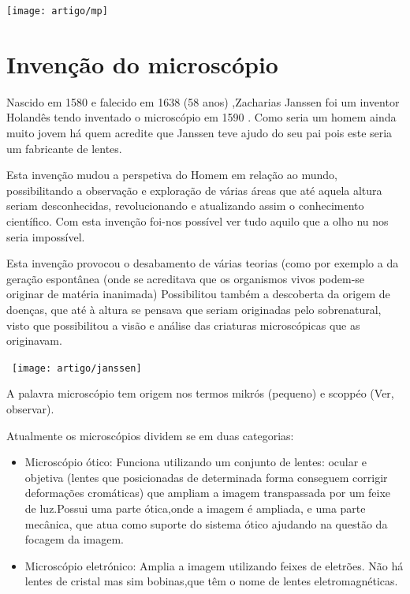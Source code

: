 \documentclass{report}
\begin{document}
\begin{center}
\texttt{[image: artigo/mp]}
\end{center}
 \begin{figure}[h]
 	\centerline{}
 \end{figure}








\chapter{Invenção do microscópio}

Nascido em 1580 e falecido em 1638 (58 anos) ,Zacharias Janssen foi um inventor Holandês tendo inventado o microscópio em 1590 .
Como seria um homem ainda muito jovem há quem acredite que Janssen teve ajudo do seu pai pois este seria um fabricante de lentes.

Esta invenção mudou a perspetiva do Homem em relação ao mundo, possibilitando a observação e exploração de várias áreas que até aquela altura seriam desconhecidas, revolucionando e atualizando assim o conhecimento científico. Com esta invenção foi-nos possível ver tudo aquilo que a olho nu nos seria impossível.

Esta invenção provocou o desabamento de várias teorias (como por exemplo a da geração espontânea (onde se acreditava que os organismos vivos podem-se originar de matéria inanimada) 
Possibilitou também a descoberta da origem de doenças, que até à altura se pensava que seriam originadas pelo sobrenatural, visto que possibilitou a visão e análise das criaturas microscópicas que as originavam.


\begin{center}
\ \texttt{[image: artigo/janssen]}
\end{center}
 \begin{figure}[h]
 	\centerline{}
 \end{figure}

\pagebreak
A palavra microscópio tem origem nos termos mikrós (pequeno) e scoppéo (Ver, observar).

Atualmente os microscópios dividem se em duas categorias:
\begin{itemize}
	\item Microscópio ótico: Funciona utilizando um conjunto de lentes: ocular e objetiva (lentes que posicionadas de determinada forma conseguem corrigir deformações cromáticas) que ampliam a imagem transpassada por um feixe de luz.Possui uma parte ótica,onde a imagem é ampliada, e uma parte mecânica, que atua como suporte do sistema ótico ajudando na questão da focagem da imagem.
	\item Microscópio eletrónico: Amplia a imagem utilizando feixes de eletrões. Não há lentes de cristal mas sim bobinas,que têm o nome de lentes eletromagnéticas.
\end{itemize}
\end{document}
